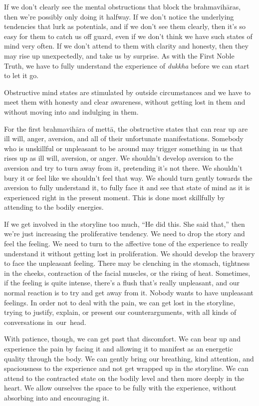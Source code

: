 If we don't clearly see the mental obstructions that block the brahmavihāras, then we're possibly only doing it halfway. If we don't notice the underlying tendencies that lurk as potentials, and if we don't see them clearly, then it's so easy for them to catch us off guard, even if we don't think we have such states of mind very often. If we don't attend to them with clarity and honesty, then they may rise up unexpectedly, and take us by surprise. As with the First Noble Truth, we have to fully understand the experience of \emph{dukkha} before we can start to let it go.

Obstructive mind states are stimulated by outside circumstances and we have to meet them with honesty and clear awareness, without getting lost in them and without moving into and indulging in them.

For the first brahmavihāra of mettā, the obstructive states that can rear up are ill will, anger, aversion, and all of their unfortunate manifestations. Somebody who is unskillful or unpleasant to be around may trigger something in us that rises up as ill will, aversion, or anger. We shouldn't develop aversion to the aversion and try to turn away from it, pretending it's not there. We shouldn't bury it or feel like we shouldn't feel that way. We should turn gently towards the aversion to fully understand it, to fully face it and see that state of mind as it is experienced right in the present moment. This is done most skillfully by attending to the bodily energies.

If we get involved in the storyline too much, ``He did this. She said that,'' then we're just increasing the proliferative tendency. We need to drop the story and feel the feeling. We need to turn to the affective tone of the experience to really understand it without getting lost in proliferation. We should develop the bravery to face the unpleasant feeling. There may be clenching in the stomach, tightness in the cheeks, contraction of the facial muscles, or the rising of heat. Sometimes, \linebreak if the feeling is quite intense, there's a flush that's really unpleasant, and our normal reaction is to try and get away from it. Nobody wants to have unpleasant feelings. In order not to deal with the pain, we can get lost in the storyline, trying to justify, explain, or present our counterarguments, with all kinds of conversations \mbox{in our head.}

With patience, though, we can get past that discomfort. We can bear up and experience the pain by facing it and allowing it to manifest as an energetic quality through the body. We can gently bring our breathing, kind attention, and spaciousness to the experience and not get wrapped up in the storyline. We can attend to the contracted state on the bodily level and then more deeply in the heart. We allow ourselves the space to be fully with the experience, without absorbing into and encouraging it.

